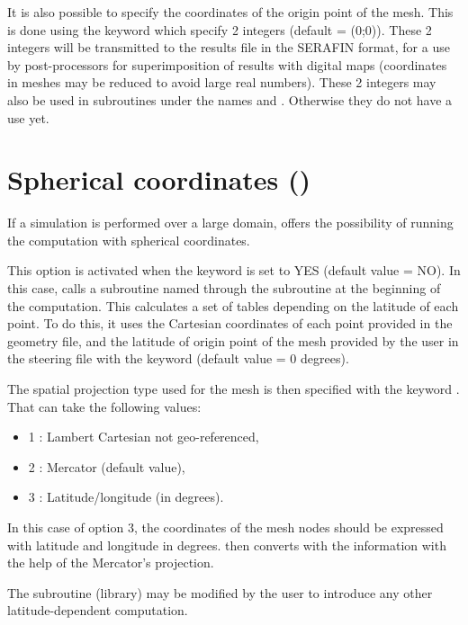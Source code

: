 It is also possible to specify the coordinates of the origin point of the mesh.
This is done using the keyword 
which specify 2 integers (default = (0;0)).
These 2 integers will be transmitted to the results file in the SERAFIN format,
for a use by post-processors for superimposition of results with digital maps
(coordinates in meshes may be reduced to avoid large real numbers).
These 2 integers may also be used in subroutines under the names
 and .
Otherwise they do not have a use yet.


\section{Spherical coordinates ()}

If a simulation is performed over a large domain,  offers
the possibility of running the computation with spherical coordinates.

This option is activated when the keyword 
is set to YES (default value = NO).
In this case,  calls a subroutine named 
through the subroutine  at the beginning of the computation.
This calculates a set of tables depending on the latitude of each point.
To do this, it uses the Cartesian coordinates of each point provided
in the geometry file, and the latitude of origin point of the mesh
provided by the user in the steering file with the keyword
 (default value = 0 degrees).

The spatial projection type used for the mesh is then specified with the
keyword . That can take the following values:
\begin{itemize}
\item 1 : Lambert Cartesian not geo-referenced,

\item 2 : Mercator (default value),

\item 3 : Latitude/longitude (in degrees).
\end{itemize}

In this case of option 3, the coordinates of the mesh nodes should be
expressed with latitude and longitude in degrees.  then converts with
the information with the help of the Mercator's projection.

The  subroutine (\bief library) may be modified by the user to introduce
any other latitude-dependent computation.



